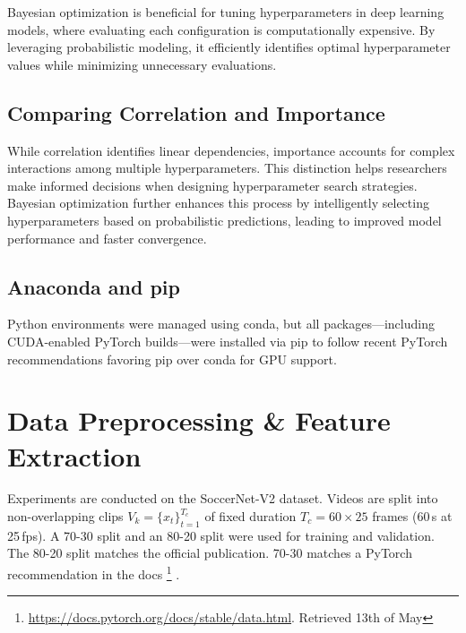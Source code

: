 Bayesian optimization is beneficial for tuning hyperparameters in deep learning models, where evaluating each configuration is computationally expensive. By leveraging probabilistic modeling, it efficiently identifies optimal hyperparameter values while minimizing unnecessary evaluations.

\subsection{Comparing Correlation and Importance}

While correlation identifies linear dependencies, importance accounts for complex interactions among multiple hyperparameters. This distinction helps researchers make informed decisions when designing hyperparameter search strategies. Bayesian optimization further enhances this process by intelligently selecting hyperparameters based on probabilistic predictions, leading to improved model performance and faster convergence.

\subsection{Anaconda and pip}
\label{ssec:conda_pip}
Python environments were managed using conda, but all packages—including CUDA-enabled PyTorch builds—were installed via pip to follow recent PyTorch recommendations favoring pip over conda for GPU support.

\section{Data Preprocessing \& Feature Extraction}
\label{sec:preprocessing}

Experiments are conducted on the SoccerNet-V2 dataset\cite{deliege_soccernet-v2_dataset_2021}. Videos are split into non-overlapping clips $V_k=\{x_t\}_{t=1}^{T_c}$ of fixed duration $T_c=60\!\times\!25$ frames (60\,s at 25\,fps). A 70-30 split and an 80-20 split were used for training and validation. The 80-20 split matches the official publication. 70-30 matches a PyTorch recommendation in the docs
\footnote{
\url{https://docs.pytorch.org/docs/stable/data.html}. 
Retrieved 13th of May}
.





